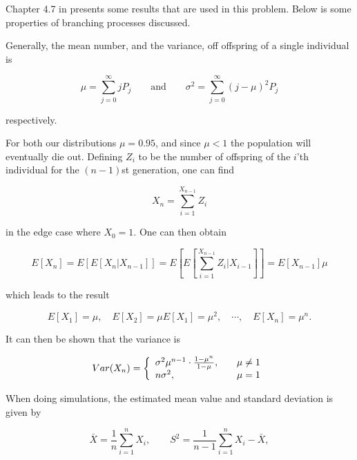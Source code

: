 Chapter 4.7 in \cite{ross} presents some results that are used in this problem. Below is some properties of branching processes discussed.

Generally, the mean number, and the variance, off offspring of a single individual is

\begin{equation}
\label{meanvar}
\mu = \sum_{j=0}^{\infty} jP_j \quad \quad \text{and} \quad \quad \sigma^2 = \sum_{j=0}^{\infty} (j-\mu)^2P_j
\end{equation}

respectively.

For both our distributions $\mu = 0.95$, and since $\mu < 1$ the population will eventually die out. Defining $Z_i$ to be the number of offspring of the $i$'th individual for the $(n-1)$st generation, one can find 

\begin{equation}
X_n = \sum_{i=1}^{X_{n-1}} Z_i
\end{equation}

in the edge case where $X_0=1$. One can then obtain

\begin{equation}
E[X_n] = E[E[X_n | X_{n-1}]] = E\left[ E\left[ \sum_{i=1}^{X_{n-1}} Z_i | X_{i-1} \right] \right] = E[X_{n-1}] \mu 
\end{equation}

which leads to the result

\begin{equation}
E[X_1] = \mu, \quad E[X_2] = \mu E[X_1] = \mu^2, \quad \cdots, \quad E[X_n] = \mu^n.
\end{equation}

It can then be shown that the variance is

\begin{align}
\label{variance}
  Var(X_n) = \left\{ 
  \begin{array}{l l l}
     \sigma^2 \mu^{n-1} \cdot \frac{1-\mu^n}{1-\mu}, \quad &\mu \neq 1\\
     n \sigma^2, \quad  &\mu = 1 \\
  \end{array} \right.
\end{align}

When doing simulations, the estimated mean value and standard deviation is given by

\begin{equation}
\bar{X} = \frac{1}{n} \sum_{i=1}^{n} X_i, \qquad S^2 = \frac{1}{n-1}\sum_{i=1}^{n} X_i - \bar{X},
\end{equation}

